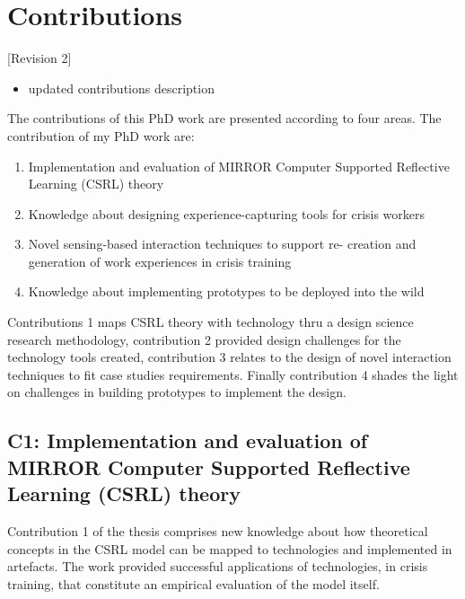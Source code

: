 \chapter{Contributions}\label{contributions}

{[}Revision 2{]}

\begin{itemize}
\itemsep1pt\parskip0pt
\item
  updated contributions description
\end{itemize}

The contributions of this PhD work are presented according to four
areas. The contribution of my PhD work are:

\begin{enumerate}
\def\labelenumi{\arabic{enumi}.}
\itemsep1pt\parskip0pt
\item
  Implementation and evaluation of MIRROR Computer Supported Reflective
  Learning (CSRL) theory
\item
  Knowledge about designing experience-capturing tools for crisis
  workers
\item
  Novel sensing-based interaction techniques to support re- creation and
  generation of work experiences in crisis training
\item
  Knowledge about implementing prototypes to be deployed into the wild
\end{enumerate}

Contributions 1 maps CSRL theory with technology thru a design science
research methodology, contribution 2 provided design challenges for the
technology tools created, contribution 3 relates to the design of novel
interaction techniques to fit case studies requirements. Finally
contribution 4 shades the light on challenges in building prototypes to
implement the design.

\section{C1: Implementation and evaluation of MIRROR Computer Supported
Reflective Learning (CSRL)
theory}\label{c1-implementation-and-evaluation-of-mirror-computer-supported-reflective-learning-csrl-theory}

Contribution 1 of the thesis comprises new knowledge about how
theoretical concepts in the CSRL model can be mapped to technologies and
implemented in artefacts. The work provided successful applications of
technologies, in crisis training, that constitute an empirical
evaluation of the model itself.

